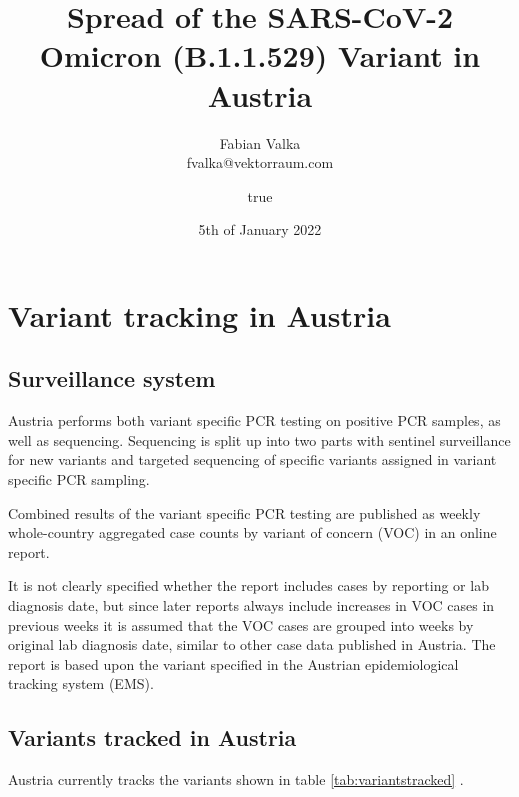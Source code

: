 \documentclass[
]{article}
\author{Fabian Valka \\ fvalka@vektorraum.com}
\affil{vektorraum}
\title{Spread of the SARS-CoV-2 Omicron (B.1.1.529) Variant in Austria}
\author{true}
\date{5th of January 2022}
\begin{document}
\maketitle

{
\setcounter{tocdepth}{2}
\tableofcontents
}
\hypertarget{variant-tracking-in-austria}{%
\section{Variant tracking in Austria}\label{variant-tracking-in-austria}}

\hypertarget{surveillance-system}{%
\subsection{Surveillance system}\label{surveillance-system}}

Austria performs both variant specific PCR testing on positive PCR samples, as well as sequencing.
Sequencing is split up into two parts with sentinel surveillance for new variants and
targeted sequencing of specific variants assigned in variant specific PCR sampling. \autocite{SARSCov2VariantenOesterreich,holzerStrategieZurVirusvariantensurveillance}

Combined results of the variant specific PCR testing are published as weekly
whole-country aggregated case counts by variant of concern (VOC) in an online report. \autocite{SARSCov2VariantenOesterreich}

It is not clearly specified whether the report includes cases by reporting or lab diagnosis date,
but since later reports always include increases in VOC cases in previous weeks it is assumed that
the VOC cases are grouped into weeks by original lab diagnosis date, similar to other case data
published in Austria. The report is based upon the variant specified in the Austrian epidemiological tracking system (EMS).

\hypertarget{variants-tracked-in-austria}{%
\subsection{Variants tracked in Austria}\label{variants-tracked-in-austria}}

Austria currently tracks the variants shown in table \ref{tab:variantstracked} \autocite{SARSCov2VariantenOesterreich,holzerStrategieZurVirusvariantensurveillance}.
\end{document}
